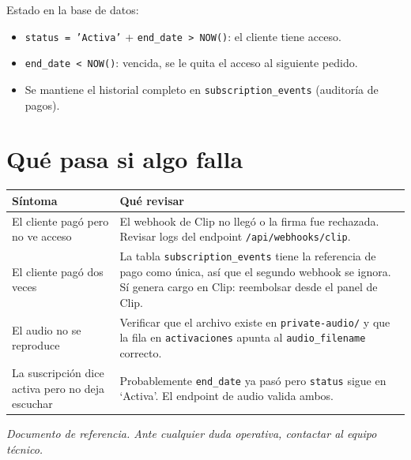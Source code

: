 \documentclass[11pt,a4paper]{article}
\begin{document}
\noindent Estado en la base de datos:
\begin{itemize}[leftmargin=*]
  \item \texttt{status = 'Activa'} + \texttt{end\_date > NOW()}: el cliente tiene acceso.
  \item \texttt{end\_date < NOW()}: vencida, se le quita el acceso al siguiente pedido.
  \item Se mantiene el historial completo en \texttt{subscription\_events} (auditoría de pagos).
\end{itemize}

\section{Qué pasa si algo falla}

\begin{center}
\begin{tabular}{@{}p{5.8cm}p{9cm}@{}}
\toprule
\textbf{Síntoma} & \textbf{Qué revisar} \\
\midrule
El cliente pagó pero no ve acceso &
El webhook de Clip no llegó o la firma fue rechazada. Revisar logs del endpoint \texttt{/api/webhooks/clip}. \\
\addlinespace
El cliente pagó dos veces &
La tabla \texttt{subscription\_events} tiene la referencia de pago como única, así que el segundo webhook se ignora. Sí genera cargo en Clip: reembolsar desde el panel de Clip. \\
\addlinespace
El audio no se reproduce &
Verificar que el archivo existe en \texttt{private-audio/} y que la fila en \texttt{activaciones} apunta al \texttt{audio\_filename} correcto. \\
\addlinespace
La suscripción dice activa pero no deja escuchar &
Probablemente \texttt{end\_date} ya pasó pero \texttt{status} sigue en `Activa'. El endpoint de audio valida ambos. \\
\bottomrule
\end{tabular}
\end{center}

\vfill
\begin{center}
\textit{Documento de referencia. Ante cualquier duda operativa, contactar al equipo técnico.}
\end{center}
\end{document}
